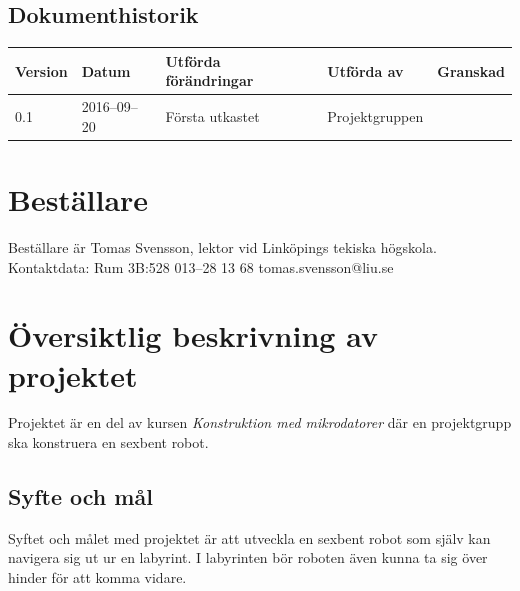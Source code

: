 \documentclass[a4paper,titlepage,12pt]{article}
\begin{document}
\begin{center}

		\section*{Dokumenthistorik}
		\renewcommand*{\arraystretch}{1.4}
		\begin{longtable}[c]{ l l l l l }
			\textbf{Version} & \textbf{Datum} & \textbf{Utförda förändringar} 
			& \textbf{Utförda av} & \textbf{Granskad} \\ \midrule

			0.1 & 2016--09--20 & Första utkastet & Projektgruppen & \\
		\end{longtable}
	\end{center}

	\newpage

	\section{Beställare}
	Beställare är Tomas Svensson, lektor vid Linköpings tekiska högskola. \\
  Kontaktdata: Rum 3B:528 013–28 13 68 tomas.svensson@liu.se


	\newpage
	\section{Översiktlig beskrivning av projektet}
	Projektet är en del av kursen \textit{Konstruktion med mikrodatorer} där en
  projektgrupp ska konstruera en sexbent robot. 

	\subsection{Syfte och mål}
	Syftet och målet med projektet är att utveckla en sexbent robot som själv
	kan navigera sig ut ur en labyrint. I labyrinten bör roboten även kunna ta
	sig över hinder för att komma vidare.

	
\end{document}
